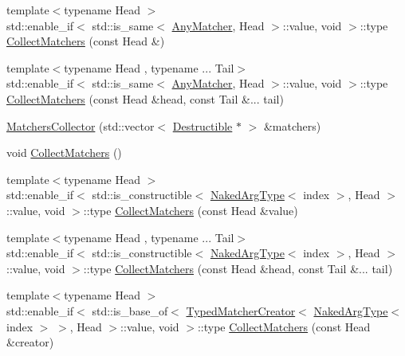 \begin{DoxyCompactItemize}
\item 
{\footnotesize template$<$typename Head $>$ }\\std\+::enable\+\_\+if$<$ std\+::is\+\_\+same$<$ \mbox{\hyperlink{structfakeit_1_1AnyMatcher}{Any\+Matcher}}, Head $>$\+::value, void $>$\+::type \mbox{\hyperlink{classfakeit_1_1MatchersCollector_a89350af9ba2e7aaead8bd7b007f03631}{Collect\+Matchers}} (const Head \&)
\item 
{\footnotesize template$<$typename Head , typename ... Tail$>$ }\\std\+::enable\+\_\+if$<$ std\+::is\+\_\+same$<$ \mbox{\hyperlink{structfakeit_1_1AnyMatcher}{Any\+Matcher}}, Head $>$\+::value, void $>$\+::type \mbox{\hyperlink{classfakeit_1_1MatchersCollector_a5bc97a3d729b1bb67e372181ad88b77d}{Collect\+Matchers}} (const Head \&head, const Tail \&... tail)
\item 
\mbox{\hyperlink{classfakeit_1_1MatchersCollector_ac5e0254e23626d189f329de8051137a6}{Matchers\+Collector}} (std\+::vector$<$ \mbox{\hyperlink{classfakeit_1_1Destructible}{Destructible}} $\ast$ $>$ \&matchers)
\item 
void \mbox{\hyperlink{classfakeit_1_1MatchersCollector_a2d9a08a347c3915daa33f307a274f13c}{Collect\+Matchers}} ()
\item 
{\footnotesize template$<$typename Head $>$ }\\std\+::enable\+\_\+if$<$ std\+::is\+\_\+constructible$<$ \mbox{\hyperlink{classfakeit_1_1MatchersCollector_aeda8ced6a2f0cb7c6e4f916f18a91730}{Naked\+Arg\+Type}}$<$ index $>$, Head $>$\+::value, void $>$\+::type \mbox{\hyperlink{classfakeit_1_1MatchersCollector_affd243a89f758239d77c70dce6318087}{Collect\+Matchers}} (const Head \&value)
\item 
{\footnotesize template$<$typename Head , typename ... Tail$>$ }\\std\+::enable\+\_\+if$<$ std\+::is\+\_\+constructible$<$ \mbox{\hyperlink{classfakeit_1_1MatchersCollector_aeda8ced6a2f0cb7c6e4f916f18a91730}{Naked\+Arg\+Type}}$<$ index $>$, Head $>$\+::value, void $>$\+::type \mbox{\hyperlink{classfakeit_1_1MatchersCollector_a29c5245d03b8fab3773455c087edde74}{Collect\+Matchers}} (const Head \&head, const Tail \&... tail)
\item 
{\footnotesize template$<$typename Head $>$ }\\std\+::enable\+\_\+if$<$ std\+::is\+\_\+base\+\_\+of$<$ \mbox{\hyperlink{structfakeit_1_1TypedMatcherCreator}{Typed\+Matcher\+Creator}}$<$ \mbox{\hyperlink{classfakeit_1_1MatchersCollector_aeda8ced6a2f0cb7c6e4f916f18a91730}{Naked\+Arg\+Type}}$<$ index $>$ $>$, Head $>$\+::value, void $>$\+::type \mbox{\hyperlink{classfakeit_1_1MatchersCollector_ae954aa74286bcd096169067f5e897356}{Collect\+Matchers}} (const Head \&creator)

\end{DoxyCompactItemize}
